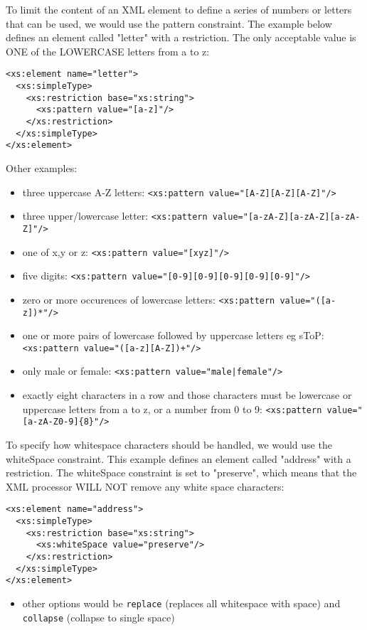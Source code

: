 \documentclass[11pt]{article}
\begin{document}
To limit the content of an XML element to define a series of numbers or letters that can be used, we would use the pattern constraint.
The example below defines an element called "letter" with a restriction. The only acceptable value is ONE of the LOWERCASE letters from a to z:
\lstset{breaklines=true,language=XML,label= ,caption= ,captionpos=b,numbers=none}
\begin{lstlisting}
<xs:element name="letter">
  <xs:simpleType>
    <xs:restriction base="xs:string">
      <xs:pattern value="[a-z]"/>
    </xs:restriction>
  </xs:simpleType>
</xs:element>
\end{lstlisting}
Other examples:
\begin{itemize}
\item three uppercase A-Z letters: \texttt{<xs:pattern value="[A-Z][A-Z][A-Z]"/>}
\item three upper/lowercase letter: \texttt{<xs:pattern value="[a-zA-Z][a-zA-Z][a-zA-Z]"/>}
\item one of x,y or z: \texttt{<xs:pattern value="[xyz]"/>}
\item five digits: \texttt{<xs:pattern value="[0-9][0-9][0-9][0-9][0-9]"/>}
\item zero or more occurences of lowercase letters: \texttt{<xs:pattern value="([a-z])*"/>}
\item one or more pairs of lowercase followed by uppercase letters eg sToP: \texttt{<xs:pattern value="([a-z][A-Z])+"/>}
\item only male or female: \texttt{<xs:pattern value="male|female"/>}
\item exactly eight characters in a row and those characters must be lowercase or uppercase letters from a to z, or a number from 0 to 9: \texttt{<xs:pattern value="[a-zA-Z0-9]\{8\}"/>}
\end{itemize}
To specify how whitespace characters should be handled, we would use the whiteSpace constraint.
This example defines an element called "address" with a restriction. The whiteSpace constraint is set to "preserve", which means that the XML processor WILL NOT remove any white space characters:
\lstset{breaklines=true,language=XML,label= ,caption= ,captionpos=b,numbers=none}
\begin{lstlisting}
<xs:element name="address">
  <xs:simpleType>
    <xs:restriction base="xs:string">
      <xs:whiteSpace value="preserve"/>
    </xs:restriction>
  </xs:simpleType>
</xs:element>
\end{lstlisting}
\begin{itemize}
\item other options would be \texttt{replace} (replaces all whitespace with space) and \texttt{collapse} (collapse to single space)
\end{itemize}
\end{document}
